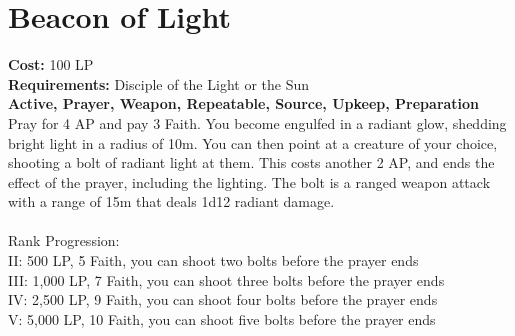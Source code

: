 \section{Beacon of Light}\label{prayer:beaconOfLight}
\textbf{Cost:} 100 LP\\
\textbf{Requirements:} Disciple of the Light or the Sun \\
\textbf{Active, Prayer, Weapon, Repeatable, Source, Upkeep, Preparation}\\
Pray for 4 AP and pay 3 Faith.
You become engulfed in a radiant glow, shedding bright light in a radius of 10m.
You can then point at a creature of your choice, shooting a bolt of radiant light at them.
This costs another 2 AP, and ends the effect of the prayer, including the lighting.
The bolt is a ranged weapon attack with a range of 15m that deals 1d12 radiant damage.\\
\\
Rank Progression:\\
II: 500 LP, 5 Faith, you can shoot two bolts before the prayer ends\\
III: 1,000 LP, 7 Faith, you can shoot three bolts before the prayer ends\\
IV: 2,500 LP, 9 Faith, you can shoot four bolts before the prayer ends\\
V: 5,000 LP, 10 Faith, you can shoot five bolts before the prayer ends\\